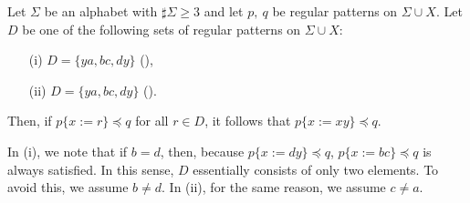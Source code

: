 \begin{lem}\label{lem:oneside}
Let $\Sigma$ be an alphabet with $\sharp\Sigma \ge 3$ and let $p,~q$ be regular patterns on $\Sigma\cup X$.
Let $D$ be one of the following sets of regular patterns on $\Sigma\cup X$:
\begin{enumerate}
\item[{\rm (i)}] $D=\{ ya, bc, dy \}$ (\TheConditionB),
\item[{\rm (ii)}] $D=\{ ya, bc, dy \}$ (\TheConditionC).
\end{enumerate}
Then, if $p \{ x := r \} \preceq q$ for all $r \in D$, it follows that $p \{ x := xy \} \preceq q$.
\end{lem}

In {\rm (i)}, we note that if $b = d$, then, because $p\{x:=dy\}\preceq q$, $p\{x:=bc\}\preceq q$ is always satisfied.
In this sense, $D$ essentially consists of only two elements.
To avoid this, we assume $b \not= d$.
In {\rm (ii)}, for the same reason, we assume $c\not= a$. 

\medskip

